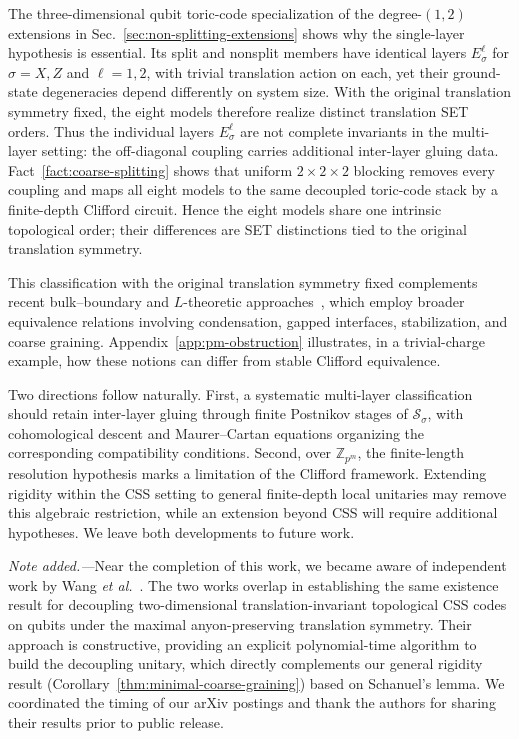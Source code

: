 \documentclass[aps,prx,english,superscriptaddress,twocolumn,tightenlines,showpacs,longbibliography,floatfix,amsfonts]{revtex4-2}
\theoremstyle{remark}
\theoremstyle{definition}
\begin{document}
The three-dimensional qubit toric-code specialization of the
degree-\((1,2)\) extensions in
Sec.~\ref{sec:non-splitting-extensions} shows why the single-layer hypothesis
is essential.  Its split and nonsplit members have identical layers
\(E_\sigma^\ell\) for \(\sigma=X,Z\) and \(\ell=1,2\), with trivial translation
action on each,
yet their ground-state degeneracies depend differently on system size.  With
the original translation symmetry fixed, the eight models therefore
realize distinct translation SET orders.  Thus the individual layers
\(E_\sigma^\ell\) are not complete invariants in the multi-layer setting: the
off-diagonal coupling carries additional inter-layer gluing data.
Fact~\ref{fact:coarse-splitting} shows that uniform \(2\times2\times2\)
blocking removes every coupling and maps all eight models to the same decoupled
toric-code stack by a finite-depth Clifford circuit. Hence the eight models
share one intrinsic topological order; their differences are SET distinctions
tied to the original translation symmetry.

This classification with the original translation symmetry fixed complements
recent bulk--boundary and \(L\)-theoretic approaches~\cite{RubaYang2025Witt,
GeikoShuklin2025Invertible,YangYu2026Classification}, which employ broader
equivalence relations involving condensation, gapped interfaces, stabilization,
and coarse graining. Appendix~\ref{app:pm-obstruction} illustrates, in a
trivial-charge example, how these notions can differ from stable Clifford
equivalence.

Two directions follow naturally.  First, a systematic multi-layer
classification should retain inter-layer gluing through finite Postnikov
stages of \(\mathscr S_\sigma\), with cohomological descent and
Maurer--Cartan equations organizing the corresponding compatibility
conditions.  Second, over \(\mathbb Z_{p^m}\), the finite-length resolution
hypothesis marks a limitation of the Clifford framework. Extending rigidity
within the CSS setting to general finite-depth local unitaries may remove this
algebraic restriction, while an extension beyond CSS will require additional
hypotheses. We leave both developments to future work.

\emph{Note added.---}Near the completion of this work, we became aware of independent work by Wang \emph{et al.}~\cite{Wang2026Decoupling}. The two works overlap in establishing the same existence result for decoupling two-dimensional translation-invariant topological CSS codes on qubits under the maximal anyon-preserving translation symmetry. Their approach is constructive, providing an explicit polynomial-time algorithm to build the decoupling unitary, which directly complements our general rigidity result (Corollary~\ref{thm:minimal-coarse-graining}) based on Schanuel's lemma. We coordinated the timing of our arXiv postings and thank the authors for sharing their results prior to public release.
\end{document}
